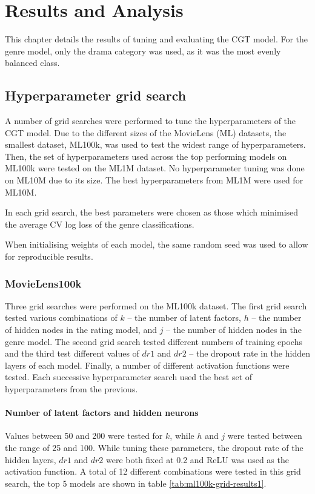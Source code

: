\chapter{Results and Analysis}
\label{results}

This chapter details the results of tuning and evaluating the CGT model. For the genre model, only the drama category was used, as it was the most evenly balanced class.

\section{Hyperparameter grid search}
A number of grid searches were performed to tune the hyperparameters of the CGT model. Due to the different sizes of the MovieLens (ML) datasets, the smallest dataset, ML100k, was used to test the widest range of hyperparameters. Then, the set of hyperparameters used across the top performing models on ML100k were tested on the ML1M dataset. No hyperparameter tuning was done on ML10M due to its size. The best hyperparameters from ML1M were used for ML10M.

In each grid search, the best parameters were chosen as those which minimised the average CV log loss of the genre classifications.

When initialising weights of each model, the same random seed was used to allow for reproducible results.

\subsection{MovieLens100k}
Three grid searches were performed on the ML100k dataset. The first grid search tested various combinations of $k$ -- the number of latent factors, $h$ -- the number of hidden nodes in the rating model, and $j$ -- the number of hidden nodes in the genre model. The second grid search tested different numbers of training epochs and the third test different values of $dr1$ and $dr2$ -- the dropout rate in the hidden layers of each model. Finally, a number of different activation functions were tested. Each successive hyperparameter search used the best set of hyperparameters from the previous.

\subsubsection{Number of latent factors and hidden neurons}
Values between 50 and 200 were tested for $k$, while $h$ and $j$ were tested between the range of 25 and 100. While tuning these parameters, the dropout rate of the hidden layers, $dr1$ and $dr2$ were both fixed at 0.2 and ReLU was used as the activation function. A total of 12 different combinations were tested in this grid search, the top 5 models are shown in table \ref{tab:ml100k-grid-results1}.

